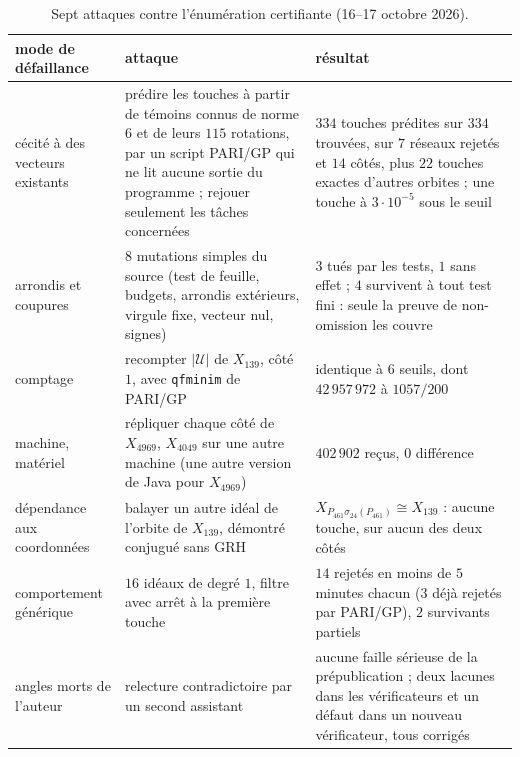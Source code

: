 \documentclass[11pt,a4paper]{amsart}
\theoremstyle{plain}
\theoremstyle{definition}
\newcommand{\Uc}{\mathcal{U}}
\begin{document}
\begin{table}[ht]
\caption{Sept attaques contre l'énumération certifiante (16--17 octobre 2026).}\label{tab:audit}
\centering\small\renewcommand{\arraystretch}{1.15}
\begin{tabular}{>{\raggedright\arraybackslash}p{2.9cm}>{\raggedright\arraybackslash}p{6.1cm}>{\raggedright\arraybackslash}p{5.1cm}}
\toprule
mode de défaillance & attaque & résultat \\
\midrule
cécité à des vecteurs existants & prédire les touches à partir de témoins connus de norme $6$ et de leurs $115$ rotations, par un script PARI/GP qui ne lit aucune sortie du programme ; rejouer seulement les tâches concernées & $334$ touches prédites sur $334$ trouvées, sur $7$ réseaux rejetés et $14$ côtés, plus $22$ touches exactes d'autres orbites ; une touche à $3\cdot10^{-5}$ sous le seuil \\
arrondis et coupures & $8$ mutations simples du source (test de feuille, budgets, arrondis extérieurs, virgule fixe, vecteur nul, signes) & $3$ tués par les tests, $1$ sans effet ; $4$ survivent à tout test fini : seule la preuve de non-omission les couvre \\
comptage & recompter $|\Uc|$ de $X_{139}$, côté $1$, avec \texttt{qfminim} de PARI/GP & identique à $6$ seuils, dont $42\,957\,972$ à $1057/200$ \\
machine, matériel & répliquer chaque côté de $X_{4969}$, $X_{4049}$ sur une autre machine (une autre version de Java pour $X_{4969}$) & $402\,902$ reçus, $0$ différence \\
dépendance aux coordonnées & balayer un autre idéal de l'orbite de $X_{139}$, démontré conjugué sans GRH & $X_{P_{461}\sigma_{24}(P_{461})}\cong X_{139}$ : aucune touche, sur aucun des deux côtés \\
comportement générique & $16$ idéaux de degré $1$, filtre avec arrêt à la première touche & $14$ rejetés en moins de $5$ minutes chacun ($3$ déjà rejetés par PARI/GP), $2$ survivants partiels \\
angles morts de l'auteur & relecture contradictoire par un second assistant & aucune faille sérieuse de la prépublication ; deux lacunes dans les vérificateurs et un défaut dans un nouveau vérificateur, tous corrigés \\
\bottomrule
\end{tabular}
\end{table}
\end{document}
